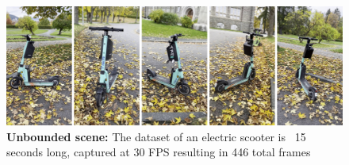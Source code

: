 \begin{figure}[!h]
    \centering
    \includegraphics[width=1.0\textwidth]{figures/tier.png}
    \caption{\textbf{Unbounded scene:} The dataset of an electric scooter is ~15 seconds long, captured at 30 FPS resulting in 446 total frames}
    \label{fig:tier}
\end{figure}

